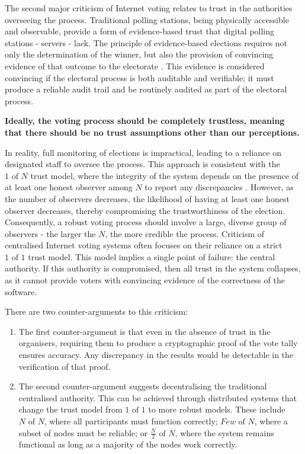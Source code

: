 \documentclass[runningheads]{llncs}
\begin{document}
The second major criticism of Internet voting relates to trust in the authorities overseeing the process. Traditional polling stations, being physically accessible and observable, provide a form of evidence-based trust that digital polling stations - servers - lack. The principle of evidence-based elections requires not only the determination of the winner, but also the provision of convincing evidence of that outcome to the electorate \cite{appelEvidenceBasedElectionsCreate2019}. This evidence is considered convincing if the electoral process is both auditable and verifiable; it must produce a reliable audit trail and be routinely audited as part of the electoral process.

\textbf{Ideally, the voting process should be completely trustless, meaning that there should be no trust assumptions other than our perceptions.}

In reality, full monitoring of elections is impractical, leading to a reliance on designated staff to oversee the process. This approach is consistent with the $1 \textrm{ of } N$ trust model, where the integrity of the system depends on the presence of at least one honest observer among $N$ to report any discrepancies \cite{buterinTrustModels2020}. However, as the number of observers decreases, the likelihood of having at least one honest observer decreases, thereby compromising the trustworthiness of the election. Consequently, a robust voting process should involve a large, diverse group of observers - the larger the $N$, the more credible the process.
Criticism of centralised Internet voting systems often focuses on their reliance on a strict $1\textrm{ of }1$ trust model. This model implies a single point of failure: the central authority. If this authority is compromised, then all trust in the system collapses, as it cannot provide voters with convincing evidence of the correctness of the software.

There are two counter-arguments to this criticism:
\begin{enumerate}
\item The first counter-argument is that even in the absence of trust in the organisers, requiring them to produce a cryptographic proof of the vote tally ensures accuracy. Any discrepancy in the results would be detectable in the verification of that proof.
\item The second counter-argument suggests decentralising the traditional centralised authority. This can be achieved through distributed systems that change the trust model from $1 \textrm{ of } 1$ to more robust models. These include $N \textrm{ of } N$, where all participants must function correctly; $Few \textrm{ of } N$, where a subset of nodes must be reliable; or $\frac{N}{2} \textrm{ of } N$, where the system remains functional as long as a majority of the nodes work correctly.
\end{enumerate}
\end{document}
